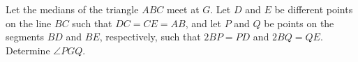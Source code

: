 Let the medians of the triangle $ABC$ meet at $G$. Let $D$ and $E$ be different points on the line $BC$ such that $DC=CE=AB$,  and let $P$ and $Q$ be points on the segments $BD$ and $BE$,  respectively, such that $2BP=PD$ and $2BQ=QE$. Determine $\angle PGQ$.